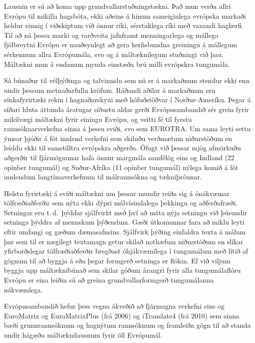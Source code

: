 \documentclass{../../metanetpaper}
\begin{document}
\begin{multicols}{2}
Lausnin er sú að koma upp grundvallarstuðningstækni. Það mun verða allri Evrópu til mikilla hagsbóta, ekki aðeins á hinum sameiginlega evrópska markaði heldur einnig í viðskiptum við önnur ríki, sérstaklega ríki með vaxandi hagkerfi. Til að ná þessu marki og varðveita jafnframt menningarlega og mállega fjölbreytni Evrópu er nauðsynlegt að gera kerfisbundna greiningu á mállegum sérkennum allra Evrópumála, svo og á máltæknilegum stuðningi við þau. Máltækni mun á endanum mynda einstæða brú milli evrópskra tungumála.

Sá búnaður til vélþýðinga og talvinnslu sem nú er á markaðnum stendur ekki enn undir þessum metnaðarfullu kröfum. Ráðandi aðilar á markaðnum eru einkafyrirtæki rekin í hagnaðarskyni með höfuðstöðvar í Norður-Ameríku. Þegar á síðari hluta áttunda áratugar síðustu aldar gerði Evrópusambandið sér grein fyrir mikilvægi máltækni fyrir einingu Evrópu, og veitti fé til fyrstu rannsóknarverkefna sinna á þessu sviði, svo sem EUROTRA. Um sama leyti settu ýmsar þjóðir á fót innlend verkefni sem skiluðu verðmætum niðurstöðum en leiddu ekki til samstilltra evrópskra aðgerða. Öfugt við þessar mjög afmörkuðu aðgerðir til fjármögnunar hafa önnur margmála samfélög eins og Indland (22 opinber tungumál) og Suður-Afríka (11 opinber tungumál) nýlega komið á fót innlendum langtímaverkefnum til málrannsókna og tækniþróunar.

Helstu fyrirtæki á sviði máltækni um þessar mundir reiða sig á ónákvæmar tölfræðiaðferðir sem nýta ekki dýpri málvísindalega þekkingu og aðferðafræði. Setningar eru t.\,d.~þýddar sjálfvirkt með því að máta nýja setningu við þúsundir setninga þýddra af mennskum þýðendum. Gæði útkomunnar fara að miklu leyti eftir umfangi og gæðum dæmasafnsins. Sjálfvirk þýðing einfaldra texta á málum þar sem til er nægilegt textamagn getur skilað nothæfum niðurstöðum en slíkar yfirborðslegar tölfræðiaðferðir bregðast óhjákvæmilega í tungumálum með lítið af gögnum til að byggja á eða þegar formgerð setninga er flókin. Ef við viljum byggja upp máltæknibúnað sem skilar góðum árangri fyrir alla tungumálaflóru Evrópu er eina leiðin sú að greina grundvallarformgerð tungumálanna nákvæmlega.


Evrópusambandið hefur þess vegna ákveðið að fjármagna verkefni eins og EuroMatrix og EuroMatrixPlus (frá 2006) og iTranslate4 (frá 2010) sem sinna bæði grunnrannsóknum og hagnýtum rannsóknum og framleiða gögn til að standa undir hágæða máltæknilausnum fyrir öll Evrópumál. 


\end{multicols}
\end{document}
